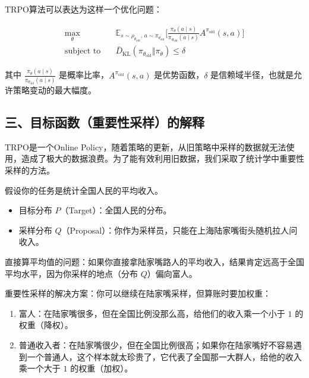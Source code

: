 TRPO算法可以表达为这样一个优化问题：

\[
\begin{aligned}
\max_\theta\quad
& \mathbb{E}_{s\sim\rho_{\theta_{\mathrm{old}}},\,a\sim\pi_{\theta_{\mathrm{old}}}}
\bigl[
\frac{\pi_\theta(a\mid s)}{\pi_{\theta_{\mathrm{old}}}(a\mid s)}
A^{\pi_{\mathrm{old}}}(s,a)
\bigr] \\
\text{subject to}\quad
& \bar{D}_{\mathrm{KL}}(\pi_{\theta_{\mathrm{old}}}\Vert \pi_\theta)\le \delta
\end{aligned}
\]

其中 \(\frac{\pi_\theta(a\mid s)}{\pi_{\theta_{\mathrm{old}}}(a\mid s)}\) 是概率比率，\(A^{\pi_{\mathrm{old}}}(s,a)\) 是优势函数，\(\delta\) 是信赖域半径，也就是允许策略变动的最大幅度。

\hypertarget{ux4e09ux76eeux6807ux51fdux6570ux91cdux8981ux6027ux91c7ux6837ux7684ux89e3ux91ca}{%
\subsection{三、目标函数（重要性采样）的解释}\label{ux4e09ux76eeux6807ux51fdux6570ux91cdux8981ux6027ux91c7ux6837ux7684ux89e3ux91ca}}

TRPO是一个Online Policy，随着策略的更新，从旧策略中采样的数据就无法使用，造成了极大的数据浪费。为了能有效利用旧数据，我们采取了统计学中重要性采样的方法。

假设你的任务是统计全国人民的平均收入。

\begin{itemize}
\tightlist
\item
  目标分布 \(P\)（Target）：全国人民的分布。
\item
  采样分布 \(Q\)（Proposal）：你作为采样员，只能在上海陆家嘴街头随机拉人问收入。
\end{itemize}

直接算平均值的问题：如果你直接拿陆家嘴路人的平均收入，结果肯定远高于全国平均水平，因为你采样的地点（分布 \(Q\)）偏向富人。

重要性采样的解决方案：你可以继续在陆家嘴采样，但算账时要加权重：

\begin{enumerate}
\def\labelenumi{\arabic{enumi}.}
\tightlist
\item
  富人：在陆家嘴很多，但在全国比例没那么高，给他们的收入乘一个小于 \(1\) 的权重（降权）。
\item
  普通收入者：在陆家嘴很少，但在全国比例很高；如果你在陆家嘴好不容易遇到一个普通人，这个样本就太珍贵了，它代表了全国那一大群人，给他的收入乘一个大于 \(1\) 的权重（加权）。
\end{enumerate}

